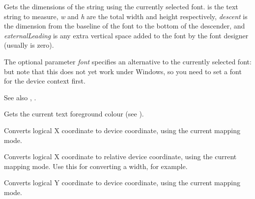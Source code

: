 Gets the dimensions of the string using the currently selected font.
 is the text string to measure, {\it w} and {\it h} are
the total width and height respectively, {\it descent} is the
dimension from the baseline of the font to the bottom of the
descender, and {\it externalLeading} is any extra vertical space added
to the font by the font designer (usually is zero).

The optional parameter {\it font} specifies an alternative
to the currently selected font: but note that this does not
yet work under Windows, so you need to set a font for
the device context first.

See also , .


\label{wxdcgettextforeground}


Gets the current text foreground colour (see ).

\label{wxdclogicaltodevicex}


Converts logical X coordinate to device coordinate, using the current
mapping mode.

\label{wxdclogicaltodevicexrel}


Converts logical X coordinate to relative device coordinate, using the current
mapping mode. Use this for converting a width, for example.

\label{wxdclogicaltodevicey}


Converts logical Y coordinate to device coordinate, using the current
mapping mode.

